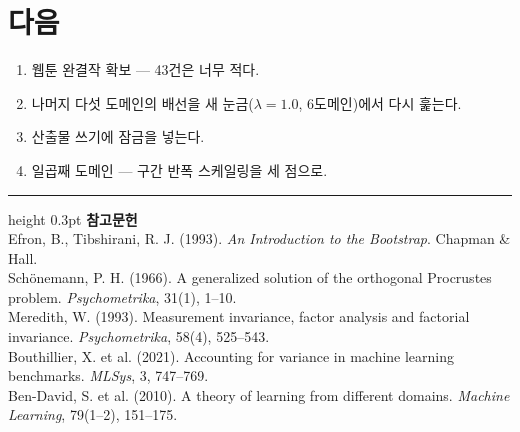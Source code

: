 \documentclass[10pt]{article}
\begin{document}
\section{다음}

\begin{enumerate}[leftmargin=1.3em,itemsep=0.15em]
\item 웹툰 완결작 확보 --- 43건은 너무 적다.
\item 나머지 다섯 도메인의 배선을 새 눈금($\lambda=1.0$, 6도메인)에서 다시 훑는다.
\item 산출물 쓰기에 잠금을 넣는다.
\item 일곱째 도메인 --- 구간 반폭 스케일링을 세 점으로.
\end{enumerate}

\vspace{0.6em}
\hrule height 0.3pt
\vspace{0.5em}
{\footnotesize
\textbf{참고문헌}\\[0.3em]
Efron, B., Tibshirani, R. J. (1993). \emph{An Introduction to the Bootstrap}.
Chapman \& Hall.\\[0.15em]
Schönemann, P. H. (1966). A generalized solution of the orthogonal Procrustes
problem. \emph{Psychometrika}, 31(1), 1--10.\\[0.15em]
Meredith, W. (1993). Measurement invariance, factor analysis and factorial
invariance. \emph{Psychometrika}, 58(4), 525--543.\\[0.15em]
Bouthillier, X. et al. (2021). Accounting for variance in machine learning
benchmarks. \emph{MLSys}, 3, 747--769.\\[0.15em]
Ben-David, S. et al. (2010). A theory of learning from different domains.
\emph{Machine Learning}, 79(1--2), 151--175.
}
\end{document}
